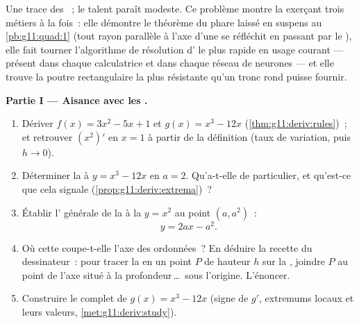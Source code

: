 \begin{problem}
\label{pb:g11:deriv:1}
Une  trace des ~; le talent paraît modeste. Ce
problème montre la  exerçant trois métiers à la fois~: elle
démontre le théorème du phare laissé en suspens au
\cref{pb:g11:quad:1} (tout rayon parallèle à l'axe d'une  se
réfléchit en passant par le ), elle fait tourner l'algorithme de
résolution d' le plus rapide en usage courant --- présent
dans chaque calculatrice et dans chaque réseau de neurones --- et
elle trouve la poutre rectangulaire la plus résistante qu'un tronc
rond puisse fournir.

\medskip
\noindent\textbf{Partie I --- Aisance avec les .}
\begin{enumerate}
  \item Dériver $f(x) = 3x^2 - 5x + 1$ et $g(x) = x^3 - 12x$
        (\cref{thm:g11:deriv:rules})~; et retrouver
        $\left(x^2\right)'$ en $x = 1$ à partir de la définition
        (taux de variation, puis $h \to 0$).
  \item Déterminer la  à $y = x^3 - 12x$ en $a = 2$.
        Qu'a-t-elle de particulier, et qu'est-ce que cela signale
        (\cref{prop:g11:deriv:extrema})~?
  \item Établir l' générale de la  à la 
        $y = x^2$ au point $(a, a^2)$~:
        \[
        y = 2ax - a^2 .
        \]
  \item Où cette  coupe-t-elle l'axe des ordonnées~? En
        déduire la recette du dessinateur~: pour tracer la 
        en un point $P$ de hauteur $h$ sur la , joindre $P$
        au point de l'axe situé à la profondeur\,\dots\ sous
        l'origine. L'énoncer.
  \item Construire le  complet de
        $g(x) = x^3 - 12x$ (signe de $g'$, extremums locaux et leurs
        valeurs, \cref{met:g11:deriv:study}).
\end{enumerate}


\end{problem}
